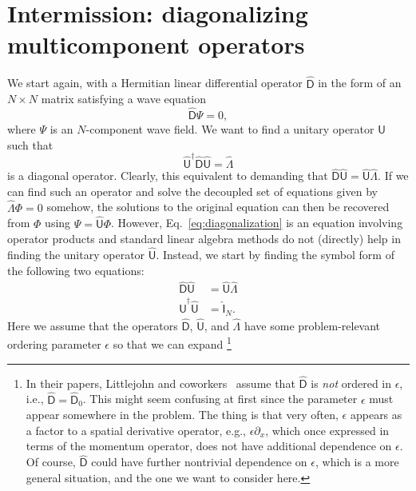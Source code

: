 \section{Intermission: diagonalizing multicomponent operators}
\label{sec:diagonalize}

We start again, with a Hermitian linear differential operator $\widehat{\mathsf{D}}$ in the form of an $N\times N$ matrix satisfying a wave equation
%
\begin{equation}
  \widehat{\mathsf{D}}\Psi = 0,
\end{equation}
%
where $\Psi$ is an $N$-component wave field.
%
We want to find a unitary operator $\widehat{\mathsf{U}}$ such that
%
\begin{equation}
  \widehat{\mathsf{U}}^{\dagger}\widehat{\mathsf{D}}\widehat{\mathsf{U}} = \widehat{\Lambda}\label{eq:diagonalization}
\end{equation}
%
is a diagonal operator.
Clearly, this equivalent to demanding that $\widehat{\mathsf{D}}\widehat{\mathsf{U}} = \widehat{\mathsf{U}}\widehat{\Lambda}$.
If we can find such an operator and solve the decoupled set of equations given by $\widehat{\Lambda}\Phi = 0$ somehow,
the solutions to the original equation can then be recovered from $\Phi$ using $\Psi = \widehat{\mathsf{U}}\Phi$.
However, Eq.~\eqref{eq:diagonalization} is an equation involving operator products and standard linear algebra methods do not (directly) help in finding the unitary operator $\widehat{\mathsf{U}}$.
Instead, we start by finding the symbol form of the following two equations:
%
\begin{equation}
  \begin{aligned}
    \widehat{\mathsf{D}}\widehat{\mathsf{U}} &= \widehat{\mathsf{U}}\widehat{\Lambda}\\
    \widehat{\mathsf{U}}^{\dagger}\widehat{\mathsf{U}} &= \hat{\mathsf{I}}_{N}.
  \end{aligned}
  \label{eq:diagonal2}
\end{equation}
%
Here we assume that the operators $\widehat{\mathsf{D}}$, $\widehat{\mathsf{U}}$, and $\widehat{\Lambda}$ have some problem-relevant ordering parameter $\epsilon$ so that we can expand%
\footnote{In their papers, Littlejohn and coworkers~\cite{littlejohn1991,weigert1993} assume that $\widehat{\mathsf{D}}$ is \emph{not} ordered in $\epsilon$, i.e., $\widehat{\mathsf{D}} = \widehat{\mathsf{D}}_{0}$.
  This might seem confusing at first since the parameter $\epsilon$ must appear somewhere in the problem.
  The thing is that very often, $\epsilon$ appears as a factor to a spatial derivative operator, e.g., $\epsilon\partial_{x}$, which once expressed in terms of the momentum operator, does not have additional dependence on $\epsilon$.
  Of course, $\widehat{\mathsf{D}}$ could have further nontrivial dependence on $\epsilon$, which is a more general situation, and the one we want to consider here.
}
